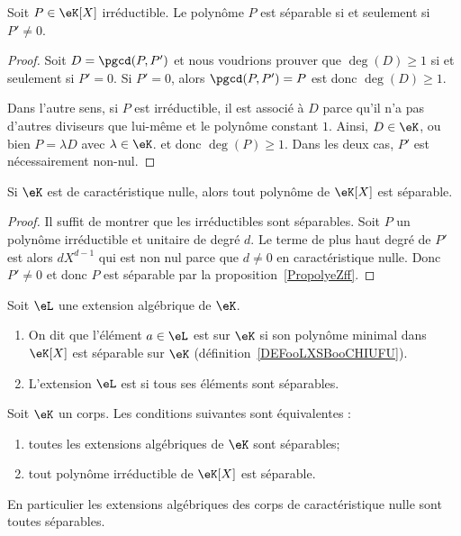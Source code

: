 \begin{proposition}
    Soit \( P\in \eK[X]\) irréductible. Le polynôme \( P\) est séparable si et seulement si \( P'\neq 0\).
\end{proposition}

\begin{proof}
    Soit \( D=\pgcd(P,P')\) et nous voudrions prouver que \( \deg(D)\geq 1\) si et seulement si \( P'=0\). Si \( P'=0\), alors \( \pgcd(P,P')=P\) est donc \( \deg(D)\geq 1\).

    Dans l'autre sens, si \( P\) est irréductible, il est associé à \( D\) parce qu'il n'a pas d'autres diviseurs que lui-même et le polynôme constant \( 1\). Ainsi, \( D \in \eK \), ou bien \( P=\lambda D\) avec \( \lambda\in \eK\). et donc \( \deg(P)\geq 1\). Dans les deux cas, \( P' \) est nécessairement non-nul.
\end{proof}

\begin{corollary}   \label{CorUjfJSE}
    Si \( \eK\) est de caractéristique nulle, alors tout polynôme de \( \eK[X]\) est séparable.
\end{corollary}

\begin{proof}
    Il suffit de montrer que les irréductibles sont séparables. Soit \( P\) un polynôme irréductible et unitaire de degré \( d\). Le terme de plus haut degré de \( P'\) est alors \( dX^{d-1}\) qui est non nul parce que \( d\neq 0\) en caractéristique nulle. Donc \( P'\neq 0\) et donc \( P\) est séparable par la proposition~\ref{PropolyeZff}.
\end{proof}

\begin{definition}      \label{DEFooKTVHooTydOTM}
    Soit \( \eL\) une extension algébrique de \( \eK\).
    \begin{enumerate}
        \item       \label{ITEMooOFYPooLYkIPr}
            On dit que l'élément \( a\in \eL\) est  sur \( \eK\) si son polynôme minimal dans \( \eK[X]\) est séparable sur \( \eK\) (définition~\ref{DEFooLXSBooCHIUFU}).
        \item
            L'extension \( \eL\) est  si tous ses éléments sont séparables.
    \end{enumerate}
\end{definition}

\begin{proposition} \label{PropUmxJVw}
    Soit \( \eK\) un corps. Les conditions suivantes sont équivalentes :
    \begin{enumerate}
        \item       \label{ITEMooUSKRooDmsGmw}
            toutes les extensions algébriques de \( \eK\) sont séparables;
        \item       \label{ITEMooJGWLooKInxSG}
            tout polynôme irréductible de \( \eK[X]\) est séparable.
    \end{enumerate}
    En particulier les extensions algébriques des corps de caractéristique nulle sont toutes séparables.
\end{proposition}

